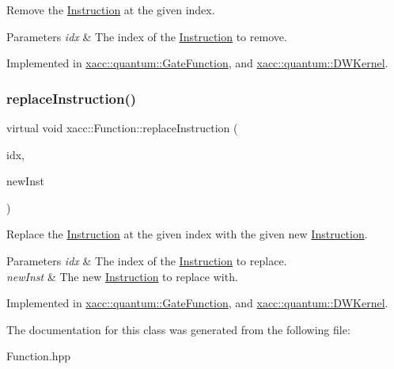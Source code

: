 Remove the \hyperlink{a01155}{Instruction} at the given index.


\begin{DoxyParams}{Parameters}
{\em idx} & The index of the \hyperlink{a01155}{Instruction} to remove. \\
\hline
\end{DoxyParams}


Implemented in \hyperlink{a01011_a44ca35d081577de9ad2930f93c01e89d}{xacc\+::quantum\+::\+Gate\+Function}, and \hyperlink{a00983_af2bcfd679e6cb89194f3f0bff8622b99}{xacc\+::quantum\+::\+D\+W\+Kernel}.

\mbox{\label{a01151_a2ef6a4923a6734f90f6ee3d94d263af0}} 
\subsubsection{\texorpdfstring{replace\+Instruction()}{replaceInstruction()}}
{\footnotesize\ttfamily virtual void xacc\+::\+Function\+::replace\+Instruction (\begin{DoxyParamCaption}\item[{const int}]{idx,  }\item[{Inst\+Ptr}]{new\+Inst }\end{DoxyParamCaption})\hspace{0.3cm}{\ttfamily [pure virtual]}}

Replace the \hyperlink{a01155}{Instruction} at the given index with the given new \hyperlink{a01155}{Instruction}.


\begin{DoxyParams}{Parameters}
{\em idx} & The index of the \hyperlink{a01155}{Instruction} to replace. \\
\hline
{\em new\+Inst} & The new \hyperlink{a01155}{Instruction} to replace with. \\
\hline
\end{DoxyParams}


Implemented in \hyperlink{a01011_a182fdfabbf546ae89e4f2384bafb45c9}{xacc\+::quantum\+::\+Gate\+Function}, and \hyperlink{a00983_a75eb3560d2f81c9a5ae1cf765deb0e83}{xacc\+::quantum\+::\+D\+W\+Kernel}.



The documentation for this class was generated from the following file\+:\begin{DoxyCompactItemize}
\item 
Function.\+hpp\end{DoxyCompactItemize}
